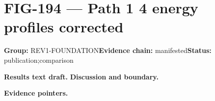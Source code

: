 \clearpage
\section{FIG-194 --- Path 1 4 energy profiles corrected}
\label{figpage:fig-194}
\textbf{Group:} REV1-FOUNDATION\quad \textbf{Evidence chain:} manifested\quad \textbf{Status:} publication;comparison

\textbf{Results text draft.} 
\textbf{Discussion and boundary.} 


\textbf{Evidence pointers.}



\vfill
